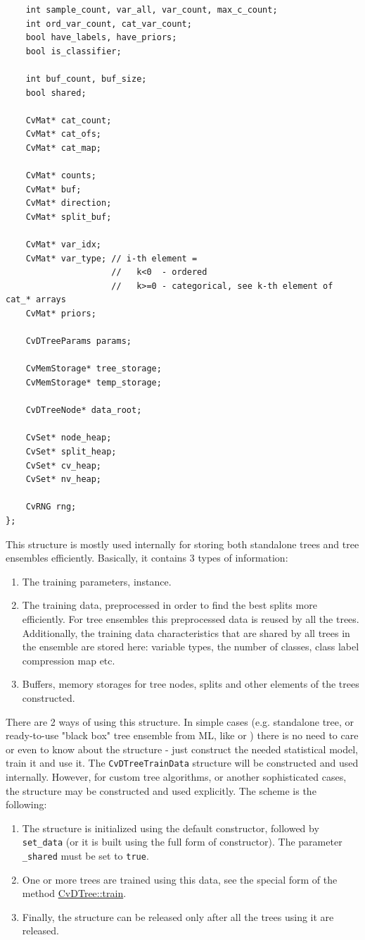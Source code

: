 \begin{lstlisting}
    int sample_count, var_all, var_count, max_c_count;
    int ord_var_count, cat_var_count;
    bool have_labels, have_priors;
    bool is_classifier;

    int buf_count, buf_size;
    bool shared;

    CvMat* cat_count;
    CvMat* cat_ofs;
    CvMat* cat_map;

    CvMat* counts;
    CvMat* buf;
    CvMat* direction;
    CvMat* split_buf;

    CvMat* var_idx;
    CvMat* var_type; // i-th element =
                     //   k<0  - ordered
                     //   k>=0 - categorical, see k-th element of cat_* arrays
    CvMat* priors;

    CvDTreeParams params;

    CvMemStorage* tree_storage;
    CvMemStorage* temp_storage;

    CvDTreeNode* data_root;

    CvSet* node_heap;
    CvSet* split_heap;
    CvSet* cv_heap;
    CvSet* nv_heap;

    CvRNG rng;
};
\end{lstlisting}


This structure is mostly used internally for storing both standalone trees and tree ensembles efficiently. Basically, it contains 3 types of information:
\begin{enumerate}
\item{The training parameters,  instance.}
\item{The training data, preprocessed in order to find the best splits more efficiently. For tree ensembles this preprocessed data is reused by all the trees. Additionally, the training data characteristics that are shared by all trees in the ensemble are stored here: variable types, the number of classes, class label compression map etc.}
\item{Buffers, memory storages for tree nodes, splits and other elements of the trees constructed.}
\end{enumerate}
There are 2 ways of using this structure. In simple cases (e.g. standalone tree, or ready-to-use "black box" tree ensemble from ML, like  or ) there is no need to care or even to know about the structure - just construct the needed statistical model, train it and use it. The \texttt{CvDTreeTrainData} structure will be constructed and used internally. However, for custom tree algorithms, or another sophisticated cases, the structure may be constructed and used explicitly. The scheme is the following:
\begin{enumerate}
\item{The structure is initialized using the default constructor, followed by \texttt{set\_data} (or it is built using the full form of constructor). The parameter \texttt{\_shared} must be set to \texttt{true}.}
\item{One or more trees are trained using this data, see the special form of the method \href{#CvDTree.3A.3Atrain}{CvDTree::train}.}
\item{Finally, the structure can be released only after all the trees using it are released.}
\end{enumerate}


